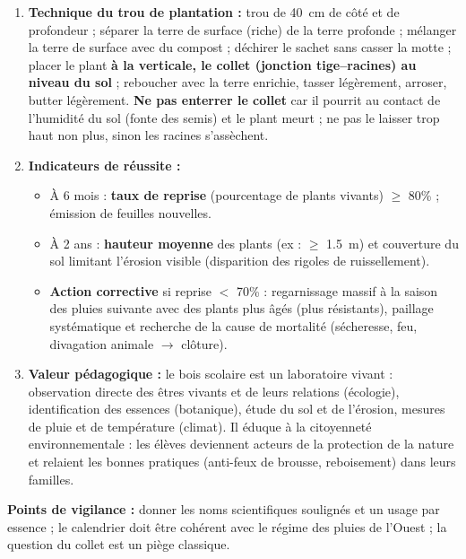 \documentclass[11pt]{article}
\begin{document}
\begin{corrige}
\begin{enumerate}
\begin{itemize}
        \item \textbf{Septembre--novembre :} deuxième désherbage, regarnissage (remplacement des plants morts) pendant la petite saison des pluies.
        \item \textbf{Novembre--décembre :} entretien des pare-feu avant la saison sèche, bilan du taux de reprise.
    \end{itemize}
    \textbf{Justification :} planter en début de saison des pluies synchronise la reprise racinaire avec la disponibilité en eau (cycle de l'eau) ; planter en saison sèche condamnerait les plants sans irrigation coûteuse.
    \item \textbf{Technique du trou de plantation :} trou de \SI{40}{cm} de côté et de profondeur ; séparer la terre de surface (riche) de la terre profonde ; mélanger la terre de surface avec du compost ; déchirer le sachet sans casser la motte ; placer le plant \textbf{à la verticale, le collet (jonction tige--racines) au niveau du sol} ; reboucher avec la terre enrichie, tasser légèrement, arroser, butter légèrement. \textbf{Ne pas enterrer le collet} car il pourrit au contact de l'humidité du sol (fonte des semis) et le plant meurt ; ne pas le laisser trop haut non plus, sinon les racines s'assèchent.
    \item \textbf{Indicateurs de réussite :}
    \begin{itemize}
        \item À 6 mois : \textbf{taux de reprise} (pourcentage de plants vivants) $\geq$ \num{80}\% ; émission de feuilles nouvelles.
        \item À 2 ans : \textbf{hauteur moyenne} des plants (ex : $\geq$ \SI{1,5}{m}) et couverture du sol limitant l'érosion visible (disparition des rigoles de ruissellement).
        \item \textbf{Action corrective} si reprise $<$ \num{70}\% : regarnissage massif à la saison des pluies suivante avec des plants plus âgés (plus résistants), paillage systématique et recherche de la cause de mortalité (sécheresse, feu, divagation animale $\rightarrow$ clôture).
    \end{itemize}
    \item \textbf{Valeur pédagogique :} le bois scolaire est un laboratoire vivant : observation directe des êtres vivants et de leurs relations (écologie), identification des essences (botanique), étude du sol et de l'érosion, mesures de pluie et de température (climat). Il éduque à la citoyenneté environnementale : les élèves deviennent acteurs de la protection de la nature et relaient les bonnes pratiques (anti-feux de brousse, reboisement) dans leurs familles.
\end{enumerate}

\textbf{Points de vigilance :} donner les noms scientifiques soulignés et un usage par essence ; le calendrier doit être cohérent avec le régime des pluies de l'Ouest ; la question du collet est un piège classique.
\end{corrige}
\end{document}

